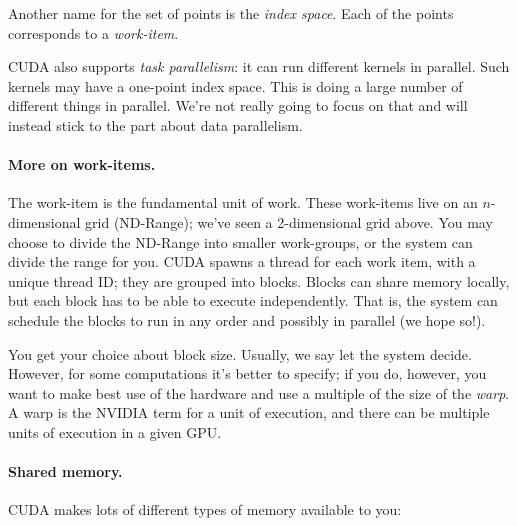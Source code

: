 \begin{center}
\end{center}

Another name for the set of points is the \emph{index space}. 
Each of the points corresponds to a \emph{work-item}.

CUDA also supports \emph{task parallelism}: it can run different
kernels in parallel. Such kernels may have a one-point index space. This is
doing a large number of different things in parallel. We're not really going
to focus on that and will instead stick to the part about data parallelism.

\paragraph{More on work-items.} The work-item is the fundamental
unit of work. These work-items live on an $n$-dimensional
grid (ND-Range); we've seen a 2-dimensional grid above. You may choose
to divide the ND-Range into smaller work-groups, or the system can
divide the range for you. CUDA spawns a thread for each work item,
with a unique thread ID; they are grouped into blocks. Blocks can share 
memory locally, but each block has to be able to execute independently.
That is, the system can schedule the blocks to run in any order and possibly
in parallel (we hope so!). 

You get your choice about block size. Usually, we say let the system decide. However, for some computations it's better to specify; if you do, however, you want to make best use of the hardware and use a multiple of the size of the \textit{warp}. A warp is the NVIDIA term for a unit of execution, and there can be multiple units of execution in a given GPU.

\paragraph{Shared memory.} CUDA makes lots of different types of
memory available to you:

